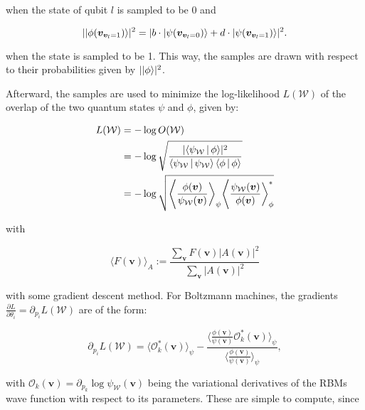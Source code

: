 when the state of qubit $l$ is sampled to be 0 and 

\begin{equation}
    \label{eq:prob2}
    \lvert \ket{\phi(\bm{v}_{\bm{v}_l = 1})} \rvert^2 = 
    \lvert  b \cdot \ket{\psi(\bm{v}_{\bm{v}_l = 0})} +
            d \cdot \ket{\psi(\bm{v}_{\bm{v}_l = 1})}
    \rvert^2.
\end{equation}

when the state is sampled to be 1. This way, the samples are drawn with respect to their 
probabilities given by $\lvert \Ket{\phi} \rvert^2$.

Afterward, the samples are used to minimize the log-likelihood $L(\mathcal{W})$ of the overlap of the two quantum 
states $\psi$ and $\phi$, given by:

\begin{align}
    L(\mathcal{W}) &= -\log{O(\mathcal{W})} \\
                   &= -\log{\sqrt{\frac{\lvert \Braket{\psi_{\mathcal{W}}|\phi} \rvert^2}{\Braket{\psi_{\mathcal{W}}|\psi_{\mathcal{W}}} \Braket{\phi|\phi}}}}\\
                   &= -\log{\sqrt{\Bigg\langle \frac{\phi(\bm{v})}{\psi_{\mathcal{W}}(\bm{v})} \bigg \rangle_{\psi} \Bigg\langle \frac{\psi_{\mathcal{W}}(\bm{v})}{\phi(\bm{v})} \bigg \rangle_{\phi}^{*}}}
\end{align}

with

\begin{equation}
    \langle F(\bm{v})\rangle_A := \frac{\sum_{\bm{v}} F(\bm{v}) \lvert A(\bm{v}) \rvert^2}{\sum_{\bm{v}} \lvert A(\bm{v})\rvert^2}
\end{equation}

with some gradient descent method. For Boltzmann machines, the gradients $\frac{\partial L}{\partial \theta_i} = \partial_{p_i}L(\mathcal{W})$ are of the form:

\begin{equation}
   \label{eq:lossgrad}
   \partial_{p_i}L(\mathcal{W}) = \langle \mathcal{O}_k^*(\bm{v}) \rangle_{\psi} - \frac{\langle \frac{\phi(\bm{v})}{\psi(\bm{v})} \mathcal{O}_k^*(\bm{v})\rangle_{\psi}}{\langle \frac{\phi(\bm{v})}{\psi(\bm{v})} \rangle_{\psi}},
\end{equation}

with $\mathcal{O}_k(\bm{v}) = \partial_{p_k}\log{\psi_{\mathcal{W}}(\bm{v})}$ being the variational derivatives of the RBMs wave function with respect to its parameters.
These are simple to compute, since

